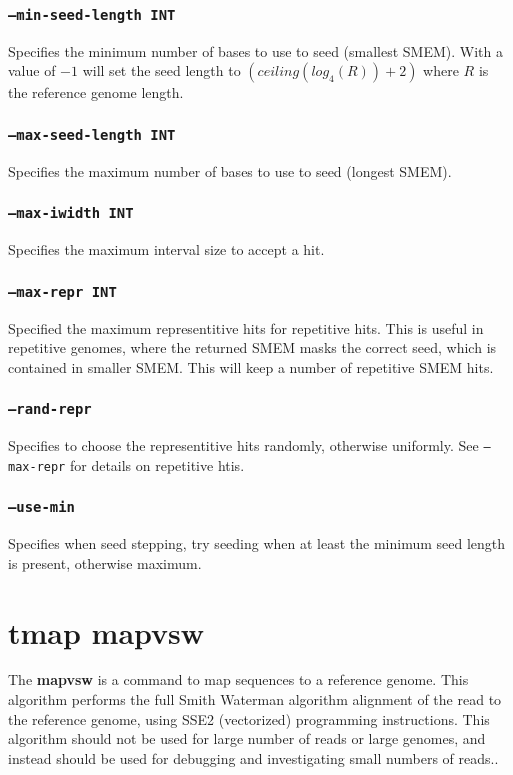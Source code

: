 \documentclass[a4paper,12pt]{book}
\newcommand{\TT}[1]{{\tt #1}} %
\newcommand{\BF}[1]{{\bf #1}} %
\begin{document}
\subsubsection{\TT{--min-seed-length INT}}
Specifies the minimum number of bases to use to seed (smallest SMEM).
With a value of $-1$ will set the seed length to $\left(ceiling(log_4(R)) + 2\right)$ where $R$ is the reference genome length.

\subsubsection{\TT{--max-seed-length INT}}
Specifies the maximum number of bases to use to seed (longest SMEM).

\subsubsection{\TT{--max-iwidth INT}}
Specifies the maximum interval size to accept a hit.

\subsubsection{\TT{--max-repr INT}}
Specified the maximum representitive hits for repetitive hits.
This is useful in repetitive genomes, where the returned SMEM masks the correct seed, which is contained in smaller SMEM.
This will keep a number of repetitive SMEM hits.

\subsubsection{\TT{--rand-repr}}
Specifies to choose the representitive hits randomly, otherwise uniformly.
See \TT{--max-repr} for details on repetitive htis.

\subsubsection{\TT{--use-min}}
Specifies when seed stepping, try seeding when at least the minimum seed length is present, otherwise maximum.

\section{tmap mapvsw}
\label{sec:mapvsw}
The \BF{mapvsw} is a command to map sequences to a reference genome.
This algorithm performs the full Smith Waterman algorithm alignment of the read to the reference genome, using SSE2 (vectorized) programming instructions.
This algorithm should not be used for large number of reads or large genomes, and instead should be used for debugging and investigating small numbers of reads..
\end{document}
